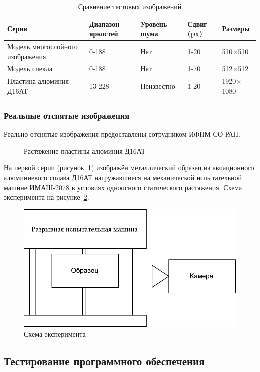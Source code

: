 \begin{longtable}[h!]{|m{}|m{}|m{}|m{}|m{}|}
\caption{Сравнение тестовых изображений}
\label{tab:set_image}
\\ \hline
Серия & Диапазон яркостей 	& Уровень шума & Сдвиг (px) &  Размеры \\ \hline
Модель многослойного изображения & 0-188 & Нет & 1-20 &  510$\times$510 \\ \hline
Модель спекла & 0-188 & Нет & 1-70 &  512$\times$512 \\ \hline
Пластина алюминия Д16АТ & 13-228 & Неизвестно & 1-20 &  1920$\times$1080\\ \hline
\end{longtable}
\subsubsection{Реальные отснятые изображения}

Реально отснятые изображения предоставлены сотрудником ИФПМ СО РАН. 
\begin{figure}[ht!]
\caption{Растяжение пластины алюминия Д16АТ}
\label{pic:al_deform}
\end{figure}
На первой серии (рисунок~\ref{pic:al_deform}) изображён металлический образец из авиационного алюминиевого сплава Д16АТ нагружавшиеся на механической испытательной машине ИМАШ-2078 в условиях одноосного статического растяжения. Схема эксперимента на рисунке~\ref{fig:gap_mach}.
\begin{figure}[ht!]
\centering
\includegraphics[width=0.7\linewidth]{images/gap_mach-crop.pdf}
\caption{Схема эксперимента}
\label{fig:gap_mach}
\end{figure}

\subsection{Тестирование программного обеспечения}
